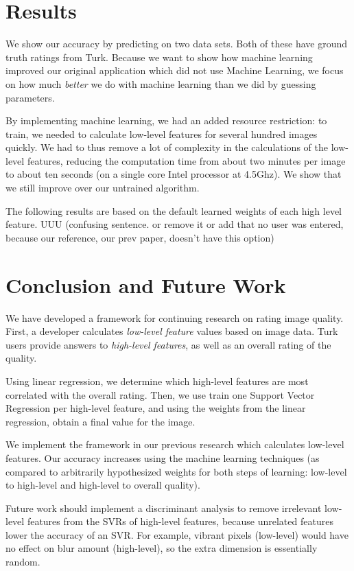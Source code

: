 \documentclass[11pt,letter]{article}
\begin{document}
\section{Results}
We show our accuracy by predicting on two data sets. Both of these have ground truth ratings from Turk. Because we want to show how machine learning improved our original application\cite{imagesorter} which did not use Machine Learning, we focus on how much \textit{better} we do with machine learning than we did by guessing parameters.

By implementing machine learning, we had an added resource restriction: to train, we needed to calculate low-level features for several hundred images quickly. We had to thus remove a lot of complexity in the calculations of the low-level features, reducing the computation time from about two minutes per image to about ten seconds (on a single core Intel processor at 4.5Ghz). We show that we still improve over our untrained algorithm.

The following results are based on the default learned weights of each high level feature.
UUU (confusing sentence. or remove it or add that
no user was entered, because our reference,
our prev paper, doesn't have this option)

\section{Conclusion and Future Work}
We have developed a framework for continuing research on rating image quality. First, a developer calculates \textit{low-level feature} values based on image data. Turk users provide answers to \textit{high-level features}, as well as an overall rating of the quality.

Using linear regression, we determine which high-level features are most correlated with the overall rating. Then, we use train one Support Vector Regression per high-level feature, and using the weights from the linear regression, obtain a final value for the image.

We implement the framework in our previous research which calculates low-level features. Our accuracy increases using the machine learning techniques (as compared to arbitrarily hypothesized weights for both steps of learning: low-level to high-level and high-level to overall quality).

Future work should implement a discriminant analysis to remove irrelevant low-level features from the SVRs of high-level features, because unrelated features lower the accuracy of an SVR. For example, vibrant pixels (low-level) would have no effect on blur amount (high-level), so the extra dimension is essentially random.
\end{document}
